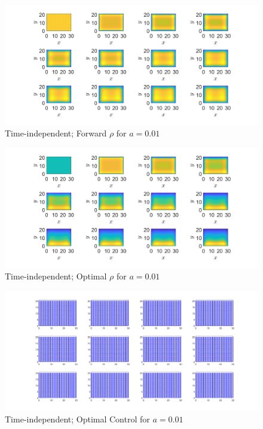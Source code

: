 \documentclass[11pt, a4paper]{article}
\theoremstyle{definition}
\begin{document}
	\begin{figure}[h]
		\centering
		\includegraphics[scale=0.35]{C1.png}
		\caption{Time-independent; Forward $\rho$ for $a = 0.01$} 
		\label{F6}
	\end{figure}	
	\begin{figure}[h]
		\centering
		\includegraphics[scale=0.35]{C2.png}
		\caption{Time-independent; Optimal $\rho$ for $a = 0.01$} 
		\label{F7}
	\end{figure}
	\begin{figure}[h]
		\centering
		\includegraphics[scale=0.35]{C3.png}
		\caption{Time-independent; Optimal Control for $a = 0.01$} 
		\label{F8}
	\end{figure}
	
\end{document}
